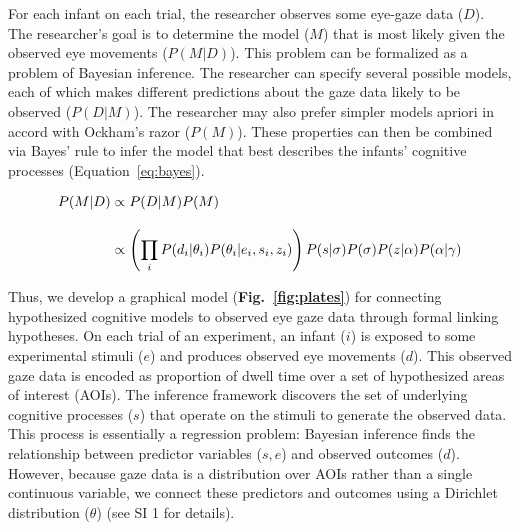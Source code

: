 \documentclass[12pt]{article}
\begin{document}
	For each infant on each trial, the researcher observes some eye-gaze data ($D$). The researcher’s goal is to determine the model ($M$) that is most likely given the observed eye movements ($P(M|D)$). This problem can be formalized as a problem of Bayesian inference. The researcher can specify several possible models, each of which makes different predictions about the gaze data likely to be observed ($P(D|M)$). The researcher may also prefer simpler models apriori in accord with Ockham’s razor ($P(M)$). These properties can then be combined via Bayes’ rule to infer the model that best describes the infants’ cognitive processes (Equation~\ref{eq:bayes}).

\begin{equation}\label{eq:bayes}
\setlength{\jot}{12pt}
\begin{aligned} 
P(M|D) &\propto P(D|M)P(M)\\
&\propto \left(\prod_{i}P(d_{i}|\theta_{i})P(\theta_{i}|e_{i},s_{i},z_{i})\right)P(s|\sigma)P(\sigma)P(z|\alpha)P(\alpha|\gamma)
\end{aligned}
\end{equation}

\vspace{24 pt}

	Thus, we develop a graphical model (\textbf{Fig.~\ref{fig:plates}}) for connecting hypothesized cognitive models to observed eye gaze data through formal linking hypotheses. On each trial of an experiment, an infant ($i$) is exposed to some experimental stimuli ($e$) and produces observed eye movements ($d$). This observed gaze data is encoded as proportion of dwell time over a set of hypothesized areas of interest (AOIs). The inference framework discovers the set of underlying cognitive processes ($s$) that operate on the stimuli to generate the observed data. This process is essentially a regression problem: Bayesian inference finds the relationship between predictor variables ($s,e$) and observed outcomes ($d$). However, because gaze data is a distribution over AOIs rather than a single continuous variable, we connect these predictors and outcomes using a Dirichlet distribution ($\theta$) (see SI 1 for details).
\end{document}
